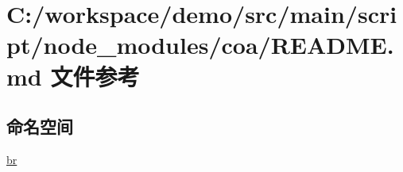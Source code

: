 \hypertarget{node__modules_2coa_2_r_e_a_d_m_e_8md}{}\section{C\+:/workspace/demo/src/main/script/node\+\_\+modules/coa/\+R\+E\+A\+D\+ME.md 文件参考}
\label{node__modules_2coa_2_r_e_a_d_m_e_8md}
\subsection*{命名空间}
\begin{DoxyCompactItemize}
\item 
 \mbox{\hyperlink{namespacebr}{br}}
\end{DoxyCompactItemize}
